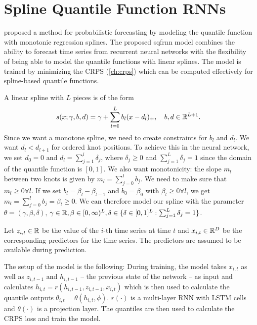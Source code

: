 \section{Spline Quantile Function RNNs}
\label{sec:sqf-rnn}

\Textcite{Gasthaus2019} proposed a method for probabilistic forecasting by modeling 
the quantile function with monotonic regression splines. 
The proposed \gls{sqfrnn} model combines the ability to forecast time series 
from recurrent neural networks with the flexibility of being able to 
model the quantile functions with linear splines. 
The model is trained by minimizing the CRPS (\ref{ch:crps}) which can be computed effectively 
for spline-based quantile functions.

A linear spline with \(L\) pieces is of the form 
\[ s(x; \gamma, b, d) = \gamma + \sum_{l=0}^L b_l (x - d_l)_+, 
\quad b, d \in \mathbb{R}^{L+1}. \]
Since we want a monotone spline, we need to create constraints for \(b_l\) and \(d_l\).
We want \(d_l < d_{l+1}\) for ordered knot positions. To achieve this 
in the neural network, we set \(d_0 = 0\) and \(d_l = \sum_{j=1}^l \delta_j\), 
where \(\delta_j \geq 0\) and \(\sum_{j=1}^L \delta_j = 1\) since the domain 
of the quantile function is \([0, 1]\). 
We also want monotonicity: the slope \(m_l\) between two knots is given by 
\(m_l = \sum_{j=0}^l b_j\). We need to make sure that \(m_l \geq 0 \forall l\).
If we set \(b_l = \beta_l - \beta_{l-1}\) and \(b_0 = \beta_0\) with \(\beta_l \geq 0 \forall l\), 
we get \(m_l = \sum_{j=0}^l b_j = \beta_l \geq 0\).
We can therefore model our spline with the parameter 
\(\theta = (\gamma, \beta, \delta)\), \(\gamma \in \mathbb{R}, \beta \in [0,\infty)^{L}, 
\delta \in \{ \delta \in [0,1]^L: \sum_{j=1}^L \delta_j = 1 \}\).

Let \(z_{i,t} \in \mathbb{R}\) be the value of the \(i\)-th time series at time \(t\) and 
\(x_{i,t} \in \mathbb{R}^D\) be the corresponding predictors for the time series. 
The predictors are assumed to be available during prediction. 

The setup of the model is the following: 
During training, the model takes \(x_{i,t}\) as well as \(z_{i, t-1}\) 
and \(h_{i, t-1}\) -- the previous state of the network -- 
as input and calculates \(h_{i,t} = r(h_{i, t-1}, z_{i, t-1}, x_{i, t})\)
which is then used to calculate the quantile outputs 
\(\theta_{i,t} = \theta(h_{i,t}, \phi)\).
\(r(\cdot)\) is a multi-layer RNN with LSTM cells and \(\theta(\cdot)\) 
is a projection layer.
The quantiles are then used to calculate the CRPS loss and train the model.